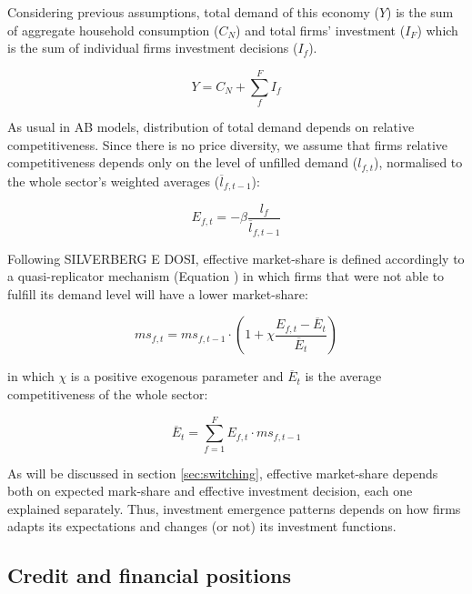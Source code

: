 \documentclass{SelfArx}
\begin{document}
Considering previous assumptions, total demand of this economy (\(Y\)) is the sum of aggregate household consumption (\(C_{N}\)) and total firms' investment (\(I_{F}\)) which is the sum of individual firms investment decisions (\(I_{f}\)).
\begin{latex}
\begin{equation}
\label{Ch_super_EQ_GDP_D}
Y = C_{N} + \sum_{f}^{F} I_{f}
\end{equation}
\end{latex}
As usual in AB models, distribution of total demand depends on relative competitiveness.
Since there is no price diversity, we assume that firms relative competitiveness depends only on the level of unfilled demand (\(l_{f,t}\)), normalised to the whole sector’s weighted averages (\(\overline{l}_{f,t-1}\)):

\begin{latex}
\begin{equation}
E_{f,t} = -\beta \frac{l_{f}}{\overline{l}_{f,t-1}}
\end{equation}
\end{latex}
Following SILVERBERG E DOSI, effective market-share is defined accordingly to a quasi-replicator mechanism (Equation ) in which firms that were not able to fulfill its demand level will have a lower market-share:
\begin{latex}
\begin{equation}
\label{Ch_super_EQ_Replicator}
ms_{f,t} = ms_{f,t-1}\cdot \left(1+\chi \frac{E_{f,t} - \overline{E}_{t}}{\overline{E}_{t}}\right)
\end{equation}
\end{latex}
in which \(\chi\) is a positive exogenous parameter and \(\overline{E}_{t}\) is the average competitiveness of the whole sector:
\begin{latex}
\begin{equation}
\overline{E}_{t} = \sum_{f=1}^{F}E_{f,t}\cdot ms_{f,t-1}
\end{equation}
\end{latex}

As will be discussed in section \ref{sec:switching}, effective market-share depends both on expected mark-share and effective investment decision, each one explained separately.
Thus, investment emergence patterns depends on how firms adapts its expectations and changes (or not) its investment functions.

\subsection{Credit and financial positions}
\label{sec:banking}
\end{document}
